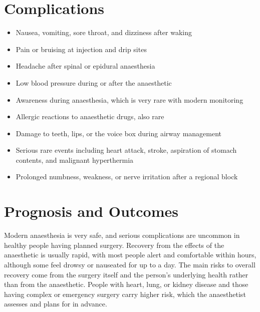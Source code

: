 \section*{Complications}
\begin{itemize}
    \item Nausea, vomiting, sore throat, and dizziness after waking
    \item Pain or bruising at injection and drip sites
    \item Headache after spinal or epidural anaesthesia
    \item Low blood pressure during or after the anaesthetic
    \item Awareness during anaesthesia, which is very rare with modern monitoring
    \item Allergic reactions to anaesthetic drugs, also rare
    \item Damage to teeth, lips, or the voice box during airway management
    \item Serious rare events including heart attack, stroke, aspiration of stomach contents, and malignant hyperthermia
    \item Prolonged numbness, weakness, or nerve irritation after a regional block
\end{itemize}

\section*{Prognosis and Outcomes}
Modern anaesthesia is very safe, and serious complications are uncommon in healthy people having planned surgery. Recovery from the effects of the anaesthetic is usually rapid, with most people alert and comfortable within hours, although some feel drowsy or nauseated for up to a day. The main risks to overall recovery come from the surgery itself and the person's underlying health rather than from the anaesthetic. People with heart, lung, or kidney disease and those having complex or emergency surgery carry higher risk, which the anaesthetist assesses and plans for in advance.

